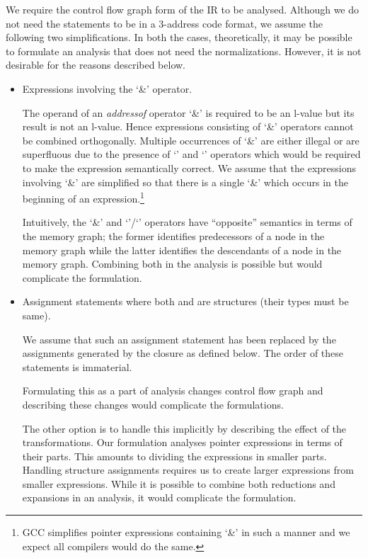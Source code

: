 \documentclass[a4paper,11pt,fleqn]{article}
\begin{document}
We require the control flow graph form of the IR to be analysed.
Although we do not need the statements to be in a 3-address code format,
we assume the following two simplifications. In both the cases,
theoretically, it may be possible to formulate an analysis that does not
need the normalizations. However, it is not desirable for the reasons
described below.
\begin{itemize}
\item Expressions involving the `\&' operator.

      The operand of an {\em addressof\/} operator `\&' is required to
      be an l-value but its result is not an l-value. Hence expressions
      consisting of `\&' operators cannot be combined orthogonally.
      Multiple occurrences of `\&' are either illegal or are superfluous
      due to the presence of `' and `' operators which
      would be required to make the expression semantically correct.
      We assume that the expressions involving `\&' are simplified so
      that there is a single `\&' which occurs in the beginning of an
      expression.\footnote{GCC simplifies pointer expressions containing
      `\&' in such a manner and we expect all compilers would do the same.}

      Intuitively, the `\&' and `'/`' operators have
      ``opposite'' semantics in terms of the memory graph; the former
      identifies predecessors of a node in the memory graph while the
      latter identifies the descendants of a node in the memory graph.
      Combining both in the analysis is possible but would complicate
      the formulation.

\item Assignment statements  where both  and 
       are structures (their types must be same).

      We assume that such an assignment statement has been replaced by 
      the assignments generated by the closure as defined below. 
      The order of these statements is immaterial.
	

      Formulating this as a part of analysis changes control flow graph
      and describing these changes would complicate the formulations.

      The other option is to handle this implicitly by describing the
      effect of the transformations. Our formulation analyses pointer
      expressions in terms of their parts. This amounts to dividing
      the expressions in smaller parts. Handling structure assignments
      requires us to create larger expressions from smaller expressions.
      While it is possible to combine both reductions and expansions in
      an analysis, it would complicate the formulation.
      
\end{itemize}
\end{document}
